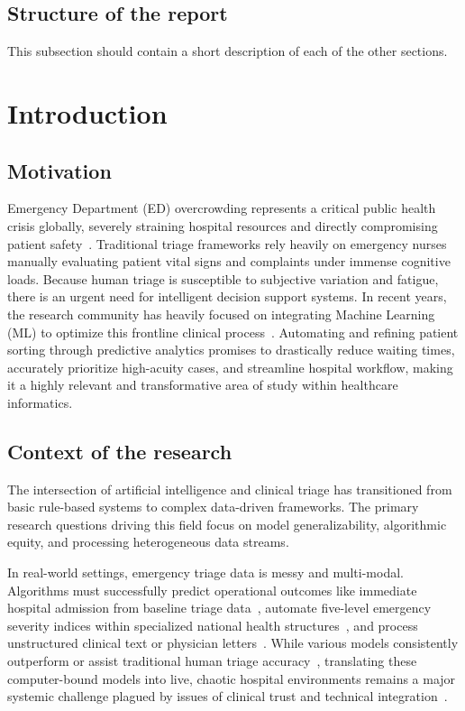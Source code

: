 \documentclass{article}
\begin{document}
\subsection{Structure of the report}

This subsection should contain a short description of each of the other sections.

\section{Introduction}

\subsection{Motivation}
Emergency Department (ED) overcrowding represents a critical public health crisis globally, severely straining hospital resources and directly compromising patient safety~\cite{Dragan}. Traditional triage frameworks rely heavily on emergency nurses manually evaluating patient vital signs and complaints under immense cognitive loads. Because human triage is susceptible to subjective variation and fatigue, there is an urgent need for intelligent decision support systems. In recent years, the research community has heavily focused on integrating Machine Learning (ML) to optimize this frontline clinical process~\cite{Sanchez2022}. Automating and refining patient sorting through predictive analytics promises to drastically reduce waiting times, accurately prioritize high-acuity cases, and streamline hospital workflow, making it a highly relevant and transformative area of study within healthcare informatics.

\subsection{Context of the research}
The intersection of artificial intelligence and clinical triage has transitioned from basic rule-based systems to complex data-driven frameworks. The primary research questions driving this field focus on model generalizability, algorithmic equity, and processing heterogeneous data streams. 

In real-world settings, emergency triage data is messy and multi-modal. Algorithms must successfully predict operational outcomes like immediate hospital admission from baseline triage data~\cite{Hong2018PredictingHA}, automate five-level emergency severity indices within specialized national health structures~\cite{Vantu2023}, and process unstructured clinical text or physician letters~\cite{Wang2023}. While various models consistently outperform or assist traditional human triage accuracy~\cite{Ivanov2021}, translating these computer-bound models into live, chaotic hospital environments remains a major systemic challenge plagued by issues of clinical trust and technical integration~\cite{FernandesReview}.
\end{document}
